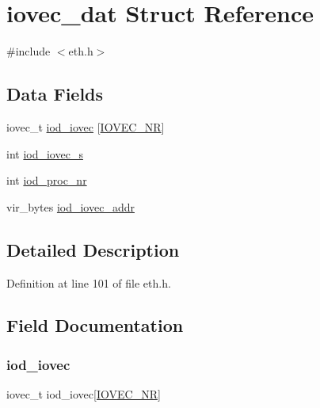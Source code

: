 \hypertarget{structiovec__dat}{}\section{iovec\+\_\+dat Struct Reference}
\label{structiovec__dat}


{\ttfamily \#include $<$eth.\+h$>$}

\subsection*{Data Fields}
\begin{DoxyCompactItemize}
\item 
iovec\+\_\+t \hyperlink{structiovec__dat_a95322900bae23267d0f5a4879e996cf3}{iod\+\_\+iovec} \mbox{[}\hyperlink{eth_8h_aed9dcbec0c1a34693655333b2683c0e4}{I\+O\+V\+E\+C\+\_\+\+NR}\mbox{]}
\item 
int \hyperlink{structiovec__dat_a90d7c9e55a65072be54bab5e5a2ec677}{iod\+\_\+iovec\+\_\+s}
\item 
int \hyperlink{structiovec__dat_aee40e017091b0b633b07d95d0bc9b0c9}{iod\+\_\+proc\+\_\+nr}
\item 
vir\+\_\+bytes \hyperlink{structiovec__dat_ae91b470b60c7c67abdffccc6ac194612}{iod\+\_\+iovec\+\_\+addr}
\end{DoxyCompactItemize}


\subsection{Detailed Description}


Definition at line 101 of file eth.\+h.



\subsection{Field Documentation}
\hypertarget{structiovec__dat_a95322900bae23267d0f5a4879e996cf3}{}\label{structiovec__dat_a95322900bae23267d0f5a4879e996cf3} 
\subsubsection{\texorpdfstring{iod\+\_\+iovec}{iod\_iovec}}
{\footnotesize\ttfamily iovec\+\_\+t iod\+\_\+iovec\mbox{[}\hyperlink{eth_8h_aed9dcbec0c1a34693655333b2683c0e4}{I\+O\+V\+E\+C\+\_\+\+NR}\mbox{]}}



